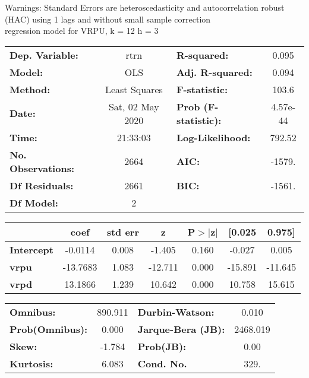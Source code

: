 Warnings: \newline
 [1] Standard Errors are heteroscedasticity and autocorrelation robust (HAC) using 1 lags and without small sample correction\\ 

regression model for VRPU, k = 12 h = 3\begin{center}
\begin{tabular}{lclc}
\toprule
\textbf{Dep. Variable:}    &       rtrn       & \textbf{  R-squared:         } &     0.095   \\
\textbf{Model:}            &       OLS        & \textbf{  Adj. R-squared:    } &     0.094   \\
\textbf{Method:}           &  Least Squares   & \textbf{  F-statistic:       } &     103.6   \\
\textbf{Date:}             & Sat, 02 May 2020 & \textbf{  Prob (F-statistic):} &  4.57e-44   \\
\textbf{Time:}             &     21:33:03     & \textbf{  Log-Likelihood:    } &    792.52   \\
\textbf{No. Observations:} &        2664      & \textbf{  AIC:               } &    -1579.   \\
\textbf{Df Residuals:}     &        2661      & \textbf{  BIC:               } &    -1561.   \\
\textbf{Df Model:}         &           2      & \textbf{                     } &             \\
\bottomrule
\end{tabular}
\begin{tabular}{lcccccc}
                   & \textbf{coef} & \textbf{std err} & \textbf{z} & \textbf{P$> |$z$|$} & \textbf{[0.025} & \textbf{0.975]}  \\
\midrule
\textbf{Intercept} &      -0.0114  &        0.008     &    -1.405  &         0.160        &       -0.027    &        0.005     \\
\textbf{vrpu}      &     -13.7683  &        1.083     &   -12.711  &         0.000        &      -15.891    &      -11.645     \\
\textbf{vrpd}      &      13.1866  &        1.239     &    10.642  &         0.000        &       10.758    &       15.615     \\
\bottomrule
\end{tabular}
\begin{tabular}{lclc}
\textbf{Omnibus:}       & 890.911 & \textbf{  Durbin-Watson:     } &    0.010  \\
\textbf{Prob(Omnibus):} &   0.000 & \textbf{  Jarque-Bera (JB):  } & 2468.019  \\
\textbf{Skew:}          &  -1.784 & \textbf{  Prob(JB):          } &     0.00  \\
\textbf{Kurtosis:}      &   6.083 & \textbf{  Cond. No.          } &     329.  \\
\bottomrule
\end{tabular}
\end{center}


